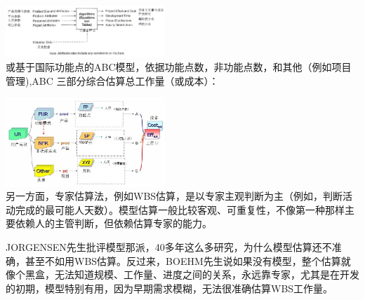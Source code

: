 
\includegraphics[width=6cm]{估算3.png}\\

或基于国际功能点的ABC模型，依据功能点数，非功能点数，和其他（例如项目管理),ABC
三部分综合估算总工作量（或成本）：


\includegraphics[width=6cm]{ABC模型.jpg}\\

另一方面，专家估算法，例如WBS估算，是以专家主观判断为主（例如，判断活动完成的最可能人天数）。模型估算一般比较客观、可重复性，不像第一种那样主要依赖人的主管判断，但依赖估算专家的能力。

JORGENSEN先生批评模型那派，40多年这么多研究，为什么模型估算还不准确，甚至不如用WBS估算。反过来，BOEHM先生说如果没有模型，整个估算就像个黑盒，无法知道规模、工作量、进度之间的关系，永远靠专家，尤其是在开发的初期，模型特别有用，因为早期需求模糊，无法很准确估算WBS工作量。\\


